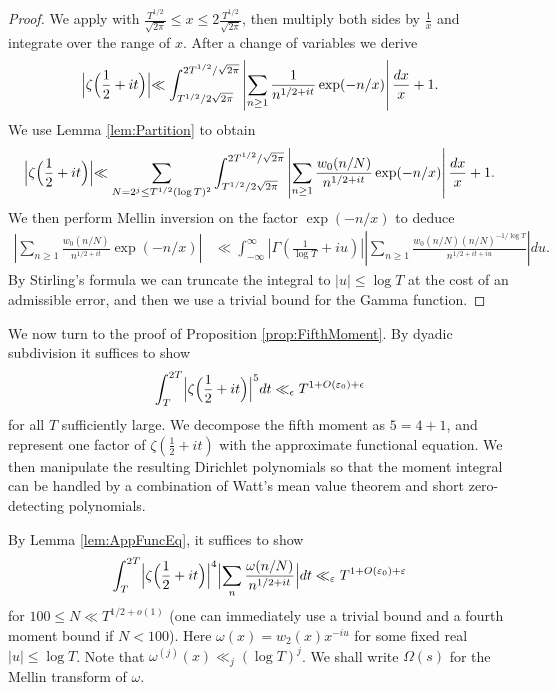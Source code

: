 \documentclass[12pt]{amsart}
\theoremstyle{plain}
\theoremstyle{definition}
\theoremstyle{remark}
\begin{document}
\begin{proof}
We apply \cite[Theorem 12.2]{Iwa2014} with $\frac{T^{1/2}}{\sqrt{2\pi}}\leq x \leq 2\frac{T^{1/2}}{\sqrt{2\pi}}$, then multiply both sides by $\frac{1}{x}$ and integrate over the range of $x$. After a change of variables we derive
\begin{align*}
\Bigr|\zeta\Bigl(\frac{1}{2}+it\Bigr)\Bigl| \ll \int_{T^{1/2}/2\sqrt{2\pi}}^{2T^{1/2}/\sqrt{2\pi}} \left|\sum_{n\geq 1} \frac{1}{n^{1/2+it}} \exp (-n/x) \right| \frac{dx}{x} + 1.
\end{align*}
We use Lemma \ref{lem:Partition} to obtain
\begin{align*}
\Bigr|\zeta\Bigl(\frac{1}{2}+it\Bigr)\Bigl| \ll \sum_{N = 2^j \leq T^{1/2}(\log T)^2}\int_{T^{1/2}/2\sqrt{2\pi}}^{2T^{1/2}/\sqrt{2\pi}} \left|\sum_{n\geq 1} \frac{w_0(n/N)}{n^{1/2+it}} \exp (-n/x) \right| \frac{dx}{x} + 1.
\end{align*}
We then perform Mellin inversion on the factor $\exp(-n/x)$ to deduce
\begin{align*}
\left|\sum_{n\geq 1} \frac{w_0(n/N)}{n^{1/2+it}} \exp (-n/x) \right| &\ll \int_{-\infty}^\infty \left|\Gamma \left(\frac{1}{\log T} + iu \right) \right| \left|\sum_{n\geq 1} \frac{w_0(n/N) (n/N)^{-1/\log T}}{n^{1/2+it+iu}} \right| du.
\end{align*}
By Stirling's formula we can truncate the integral to $|u| \leq \log T$ at the cost of an admissible error, and then we use a trivial bound for the Gamma function.
\end{proof}
%
%
%
%
We now turn to the proof of Proposition \ref{prop:FifthMoment}. By dyadic subdivision it suffices to show
\begin{align*}
\int_T^{2T} \Bigl| \zeta \Bigl(\frac{1}{2}+it \Bigr) \Bigr|^{5}dt \ll_\epsilon T^{1+O(\varepsilon_0)+\epsilon}
\end{align*}
for all $T$ sufficiently large. We decompose the fifth moment as $5=4+1$, and represent one factor of $\zeta(\frac{1}{2}+it)$ with the approximate functional equation. We then manipulate the resulting Dirichlet polynomials so that the moment integral can be handled by a combination of Watt's mean value theorem and short zero-detecting polynomials.

By Lemma \ref{lem:AppFuncEq}, it suffices to show
\begin{align*}
\int_T^{2T} \Bigl| \zeta \Bigl(\frac{1}{2}+it \Bigr) \Bigr|^{4} \Bigl| \sum_n \frac{ \omega(n/N) }{n^{1/2+it}}\Bigr| dt \ll_\varepsilon T^{1+O(\varepsilon_0)+\varepsilon}
\end{align*}
for $100 \leq N \ll T^{1/2+o(1)}$ (one can immediately use a trivial bound and a fourth moment bound if $N< 100$). Here $\omega(x) = w_2(x) x^{-iu}$ for some fixed real $|u| \leq \log T$. Note that $\omega^{(j)}(x) \ll_j (\log T)^j$. We shall write $\Omega(s)$ for the Mellin transform of $\omega$.
\end{document}
